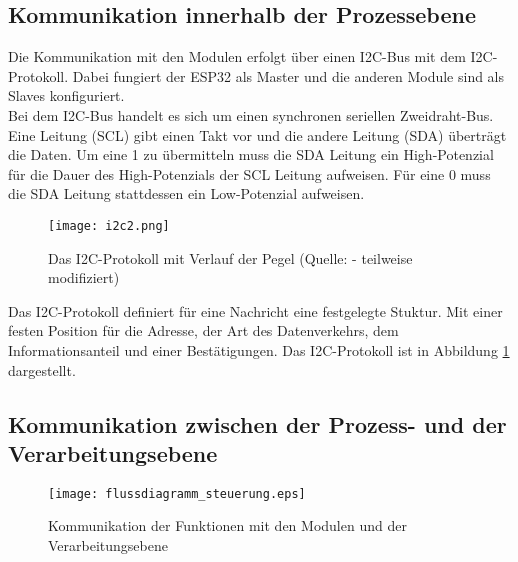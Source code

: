\subsection{Kommunikation innerhalb der Prozessebene}
Die Kommunikation mit den Modulen erfolgt über einen I2C-Bus mit dem I2C-Protokoll. Dabei fungiert der ESP32 als Master und die anderen Module sind als Slaves konfiguriert.
\\
Bei dem I2C-Bus handelt es sich um einen synchronen seriellen Zweidraht-Bus. Eine Leitung (SCL) gibt einen Takt vor und die andere Leitung (SDA) überträgt die Daten. Um eine 1 zu übermitteln muss die SDA Leitung ein High-Potenzial für die Dauer des High-Potenzials der SCL Leitung aufweisen. Für eine 0 muss die SDA Leitung stattdessen ein Low-Potenzial aufweisen.
\cite{i2c_manual}

\begin{figure}[h]
\centering
\texttt{[image: i2c2.png]}
\caption{Das I2C-Protokoll mit Verlauf der Pegel (Quelle: \cite{electric_imp} - teilweise modifiziert)}
\label{i2c}
\end{figure}
\noindent
Das I2C-Protokoll definiert für eine Nachricht eine festgelegte Stuktur. Mit einer festen Position für die Adresse, der Art des Datenverkehrs, dem Informationsanteil und einer Bestätigungen. Das I2C-Protokoll ist in Abbildung \ref{i2c} dargestellt.

\subsection{Kommunikation zwischen der Prozess- und der Verarbeitungsebene}

\begin{figure}[h]
\hspace*{-2cm}
\centering
\texttt{[image: flussdiagramm\_steuerung.eps]}
\caption{Kommunikation der Funktionen mit den Modulen und der Verarbeitungsebene}
\label{kommunikation_module}
\end{figure}

